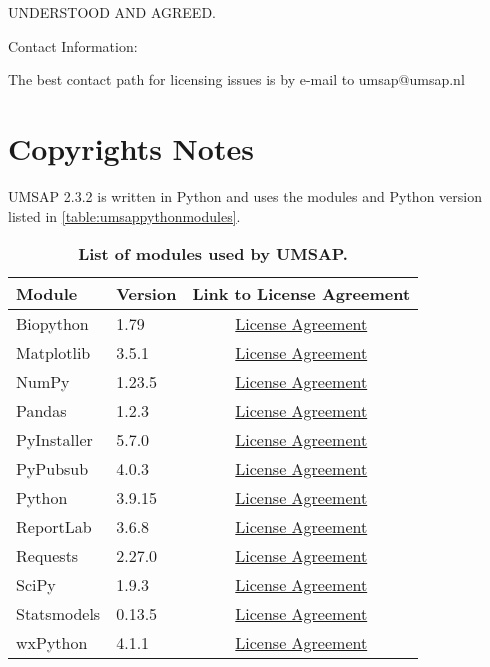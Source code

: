 UNDERSTOOD AND AGREED.

Contact Information:

The best contact path for licensing issues is by e-mail to umsap@umsap.nl

\section{Copyrights Notes}

UMSAP \num[parse-numbers=false]{2.3.2} is written in Python and uses the modules
and Python version listed in \autoref{table:umsappythonmodules}.
\begin{table}[h!]
    \centering
    \begin{tabular}{llc}
        \hline
        Module & Version & Link to License Agreement\\
        \hline
        Biopython   & \num{1.79}                        & \href{https://github.com/biopython/biopython/blob/master/LICENSE.rst}{License Agreement}\\
        Matplotlib  & \num[parse-numbers=false]{3.5.1}  & \href{https://matplotlib.org/3.3.4/users/license.html}{License Agreement}\\
        NumPy       & \num[parse-numbers=false]{1.23.5} & \href{https://numpy.org/doc/stable/license.html}{License Agreement}\\
        Pandas      & \num[parse-numbers=false]{1.2.3}  & \href{https://pandas.pydata.org/docs/getting_started/overview.html#license}{License Agreement}\\
        PyInstaller & \num[parse-numbers=false]{5.7.0}  & \href{https://pyinstaller.org/en/stable/license.html}{License Agreement}\\
        PyPubsub    & \num[parse-numbers=false]{4.0.3}  & \href{https://pypubsub.readthedocs.io/en/v4.0.3/about.html}{License Agreement}\\
        Python      & \num[parse-numbers=false]{3.9.15} & \href{https://docs.python.org/3.9/license.html}{License Agreement}\\
        ReportLab   & \num[parse-numbers=false]{3.6.8}  & \href{https://www.reportlab.com/dev/docs/faq/#1.3}{License Agreement}\\
        Requests    & \num[parse-numbers=false]{2.27.0} & \href{https://github.com/psf/requests/blob/main/LICENSE}{License Agreement}\\
        SciPy       & \num[parse-numbers=false]{1.9.3}  & \href{https://github.com/scipy/scipy/blob/main/LICENSE.txt}{License Agreement}\\
        Statsmodels & \num[parse-numbers=false]{0.13.5} & \href{https://www.statsmodels.org/stable/dev/index.html#license}{License Agreement}\\
        wxPython    & \num[parse-numbers=false]{4.1.1}  & \href{https://wxpython.org/pages/license/index.html}{License Agreement}\\
        \hline
    \end{tabular}
    \caption[List of modules used by UMSAP]{\textbf{List of modules used by UMSAP.}}
    \label{table:umsappythonmodules}
\end{table}
\newpage